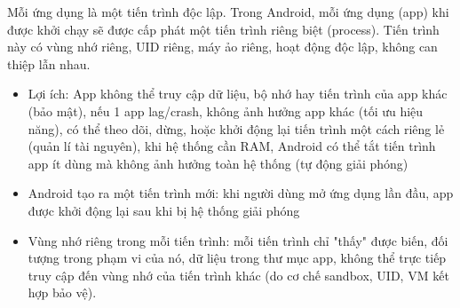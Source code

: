 \renewcommand{\labelitemi}{--}    
        Mỗi ứng dụng là một tiến trình độc lập. Trong Android, mỗi ứng dụng (app) khi được khởi chạy sẽ được cấp phát một tiến trình riêng biệt (process). Tiến trình này có vùng nhớ riêng, UID riêng, máy ảo riêng, hoạt động độc lập, không can thiệp lẫn nhau.
      \setlength{\leftmargini}{1.5cm}
      \begin{itemize}
        \item Lợi ích: App không thể truy cập dữ liệu, bộ nhớ hay tiến trình của app khác (bảo mật), nếu 1 app lag/crash, không ảnh hưởng app khác (tối ưu hiệu năng), có thể theo dõi, dừng, hoặc khởi động lại tiến trình một cách riêng lẻ (quản lí tài nguyên), khi hệ thống cần RAM, Android có thể tắt tiến trình app ít dùng mà không ảnh hưởng toàn hệ thống (tự động giải phóng)
        \item Android tạo ra một tiến trình mới: khi người dùng mở ứng dụng lần đầu, app được khởi động lại sau khi bị hệ thống giải phóng
        \item Vùng nhớ riêng trong mỗi tiến trình: mỗi tiến trình chỉ "thấy" được biến, đối tượng trong phạm vi của nó, dữ liệu trong thư mục app, không thể trực tiếp truy cập đến vùng nhớ của tiến trình khác (do cơ chế sandbox, UID, VM kết hợp bảo vệ).
      \end{itemize}
